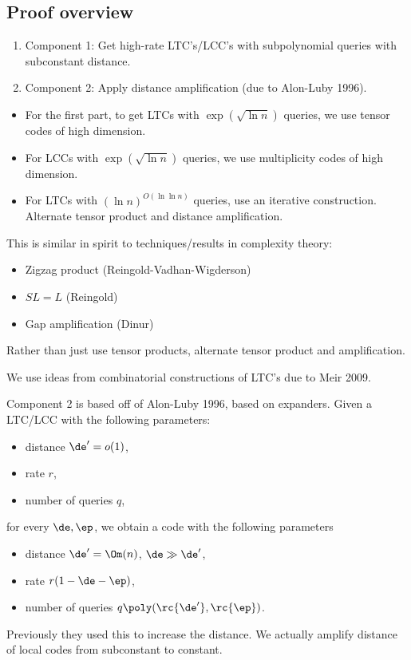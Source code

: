 \subsection{Proof overview}
\begin{enumerate}
\item
Component 1: Get high-rate LTC's/LCC's with subpolynomial queries with subconstant distance.
\item
Component 2: Apply distance amplification (due to Alon-Luby 1996).
\end{enumerate}

\begin{itemize}
\item
For the first part, to get LTCs with $\exp(\sqrt{\ln n})$ queries, we use tensor codes of high dimension. 
\item
For LCCs with $\exp(\sqrt{\ln n})$ queries, we use multiplicity codes of high dimension. %
\item
For LTCs with $(\ln n)^{O(\ln \ln n)}$ queries, use an iterative construction. Alternate tensor product and distance amplification.
\end{itemize}

This is similar in spirit to techniques/results in complexity theory:
\begin{itemize}
\item
Zigzag product (Reingold-Vadhan-Wigderson)
\item
$SL=L$ (Reingold)
\item
Gap amplification (Dinur)
\end{itemize}
Rather than just use tensor products, alternate tensor product and amplification.

We use ideas from combinatorial constructions of LTC's due to Meir 2009. %

Component 2 is based off of Alon-Luby 1996, based on expanders. Given a LTC/LCC with the following parameters:
\begin{itemize}
\item
distance $\de'=o(1)$,
\item
rate $r$,
\item
number of queries $q$,
\end{itemize}
for every $\de,\ep$, we obtain a code with the following parameters 
\begin{itemize}
\item
distance $\de'=\Om(n)$, $\de\gg \de'$,
\item
rate $r(1-\de-\ep)$,
\item
number of queries $q\poly(\rc{\de'},\rc{\ep})$.
\end{itemize}
Previously they used this to increase the distance. We actually amplify distance of local codes from subconstant to constant.

